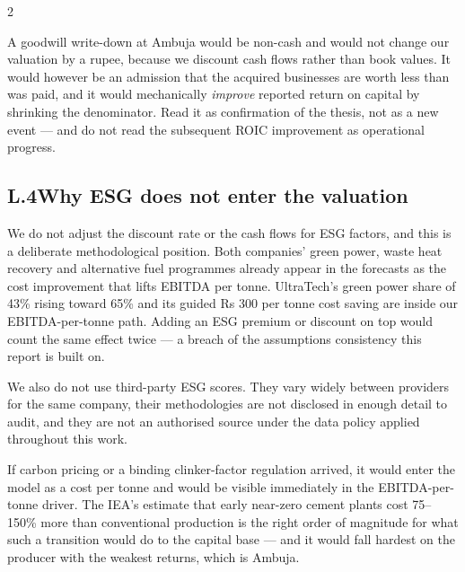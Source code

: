 \begin{paracol}{2}
\begin{warnbox}
A goodwill write-down at Ambuja would be non-cash and would not change our valuation by
a rupee, because we discount cash flows rather than book values. It would however be an
admission that the acquired businesses are worth less than was paid, and it would
mechanically \emph{improve} reported return on capital by shrinking the denominator.
Read it as confirmation of the thesis, not as a new event — and do not read the
subsequent ROIC improvement as operational progress.
\end{warnbox}

\subsection*{L.4\quad Why ESG does not enter the valuation}

We do not adjust the discount rate or the cash flows for ESG factors, and this is a
deliberate methodological position. Both companies' green power, waste heat recovery
and alternative fuel programmes already appear in the forecasts as the cost improvement
that lifts EBITDA per tonne. UltraTech's green power share of 43\% rising toward 65\%
and its guided Rs 300 per tonne cost saving are inside our EBITDA-per-tonne path.
Adding an ESG premium or discount on top would count the same effect twice — a breach
of the assumptions consistency this report is built on.

We also do not use third-party ESG scores. They vary widely between providers for the
same company, their methodologies are not disclosed in enough detail to audit, and they
are not an authorised source under the data policy applied throughout this work.

\begin{okbox}
If carbon pricing or a binding clinker-factor regulation arrived, it would enter the
model as a cost per tonne and would be visible immediately in the EBITDA-per-tonne
driver. The IEA's estimate that early near-zero cement plants cost 75--150\% more than
conventional production is the right order of magnitude for what such a transition
would do to the capital base — and it would fall hardest on the producer with the
weakest returns, which is Ambuja.
\end{okbox}
\end{paracol}
